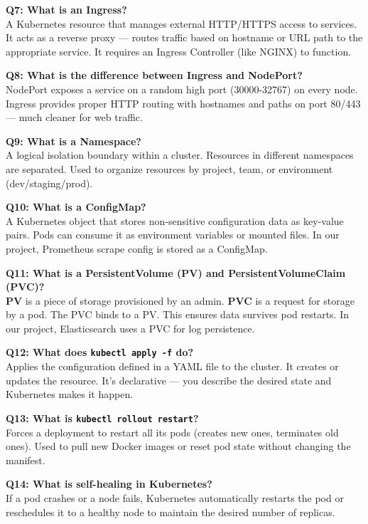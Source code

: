 \documentclass[12pt,a4paper]{article}
\begin{document}
\textbf{Q7: What is an Ingress?}\\
A Kubernetes resource that manages external HTTP/HTTPS access to services. It acts as a reverse proxy --- routes traffic based on hostname or URL path to the appropriate service. It requires an Ingress Controller (like NGINX) to function.

\textbf{Q8: What is the difference between Ingress and NodePort?}\\
NodePort exposes a service on a random high port (30000-32767) on every node. Ingress provides proper HTTP routing with hostnames and paths on port 80/443 --- much cleaner for web traffic.

\textbf{Q9: What is a Namespace?}\\
A logical isolation boundary within a cluster. Resources in different namespaces are separated. Used to organize resources by project, team, or environment (dev/staging/prod).

\textbf{Q10: What is a ConfigMap?}\\
A Kubernetes object that stores non-sensitive configuration data as key-value pairs. Pods can consume it as environment variables or mounted files. In our project, Prometheus scrape config is stored as a ConfigMap.

\textbf{Q11: What is a PersistentVolume (PV) and PersistentVolumeClaim (PVC)?}\\
\textbf{PV} is a piece of storage provisioned by an admin. \textbf{PVC} is a request for storage by a pod. The PVC binds to a PV. This ensures data survives pod restarts. In our project, Elasticsearch uses a PVC for log persistence.

\textbf{Q12: What does \texttt{kubectl apply -f} do?}\\
Applies the configuration defined in a YAML file to the cluster. It creates or updates the resource. It's declarative --- you describe the desired state and Kubernetes makes it happen.

\textbf{Q13: What is \texttt{kubectl rollout restart}?}\\
Forces a deployment to restart all its pods (creates new ones, terminates old ones). Used to pull new Docker images or reset pod state without changing the manifest.

\textbf{Q14: What is self-healing in Kubernetes?}\\
If a pod crashes or a node fails, Kubernetes automatically restarts the pod or reschedules it to a healthy node to maintain the desired number of replicas.
\end{document}
